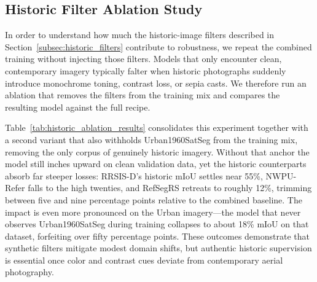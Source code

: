 \subsection{Historic Filter Ablation Study}
\label{subsec:historic_ablation}

In order to understand how much the historic-image filters described in Section~\ref{subsec:historic_filters} contribute to robustness, we repeat the combined training without injecting those filters. Models that only encounter clean, contemporary imagery typically falter when historic photographs suddenly introduce monochrome toning, contrast loss, or sepia casts. We therefore run an ablation that removes the filters from the training mix and compares the resulting model against the full recipe.

Table~\ref{tab:historic_ablation_results} consolidates this experiment together with a second variant that also withholds Urban1960SatSeg from the training mix, removing the only corpus of genuinely historic imagery. Without that anchor the model still inches upward on clean validation data, yet the historic counterparts absorb far steeper losses: RRSIS-D's historic mIoU settles near 55\%, NWPU-Refer falls to the high twenties, and RefSegRS retreats to roughly 12\%, trimming between five and nine percentage points relative to the combined baseline. The impact is even more pronounced on the Urban imagery—the model that never observes Urban1960SatSeg during training collapses to about 18\% mIoU on that dataset, forfeiting over fifty percentage points. These outcomes demonstrate that synthetic filters mitigate modest domain shifts, but authentic historic supervision is essential once color and contrast cues deviate from contemporary aerial photography.


